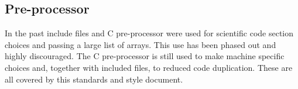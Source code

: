 \subsection{Pre-processor}
In the past include files and C pre-processor were used for scientific code section choices and passing a large list of arrays. 
This use has been phased out and highly discouraged. 
The C pre-processor is still used to make machine specific choices and, together with included files, to  
reduced code duplication. These are all covered by this standards and style document. 

